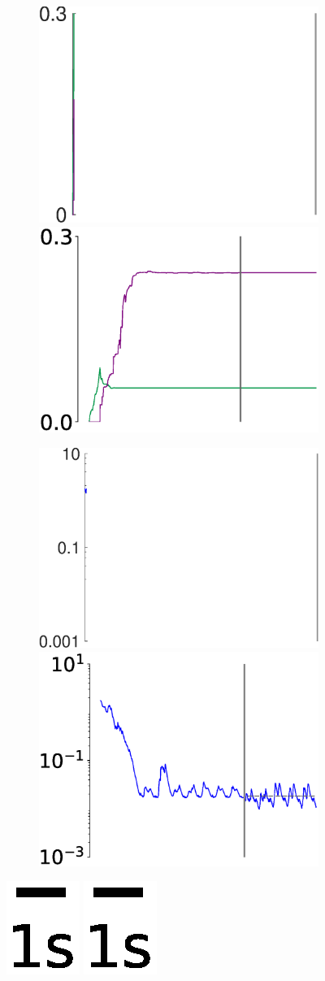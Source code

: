 \begin{figure}
\begin{subfigure}{\textwidth}
        \hspace{.5em}
        \includegraphics[trim=0cm 0cm 0cm 0cm,clip=true,height=0.15\linewidth,width=.45\linewidth]{Figures/Fig_T5/MATLAB/ST_T2_Seg3_Var_W_norm.eps}
        \hspace{0em}
        \includegraphics[trim=0cm 0cm 0cm 0cm,clip=true,height=0.15\linewidth,width=.45\linewidth]{Figures/Fig_T5/ImprovP/ST_T2_Seg3_Var_W_norm.eps}
    
    \end{subfigure}
    
    
    \vspace{4em}
    
    \textbf{}\begin{subfigure}{\textwidth}
        \centering
        
        \hspace{-.5em}
    \includegraphics[trim=0cm 0cm 0cm 0cm,clip=true,height=0.15\linewidth,width=.4\linewidth]{Figures/Fig_T5/MATLAB/ST_T2_Seg3_Var_MSE.eps}
        \hspace{1.5em}
        \includegraphics[trim=0cm 0cm 0cm 0cm,clip=true,clip=true,height=0.15\linewidth,width=.45\linewidth]{Figures/Fig_T5/ImprovP/ST_T2_Seg3_Var_MSE.eps}
    
    \end{subfigure}
        
    
        
        \includegraphics[trim=2cm 6cm 2cm 6cm, clip=true,height=0.05\linewidth,width=.4\linewidth]{Figures/Fig_T1/Python/ST_T1_Scale.eps}
        \includegraphics[trim=2cm 4cm 2cm 6cm, clip=true,height=0.05\linewidth,width=.45\linewidth]{Figures/Fig_T1/Python/ST_T1_Scale.eps}




\end{figure}
